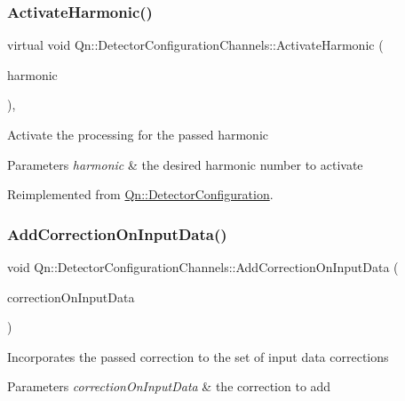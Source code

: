 \subsubsection{\texorpdfstring{Activate\+Harmonic()}{ActivateHarmonic()}}
{\footnotesize\ttfamily virtual void Qn\+::\+Detector\+Configuration\+Channels\+::\+Activate\+Harmonic (\begin{DoxyParamCaption}\item[{Int\+\_\+t}]{harmonic }\end{DoxyParamCaption})\hspace{0.3cm}{\ttfamily [inline]}, {\ttfamily [virtual]}}

Activate the processing for the passed harmonic 
\begin{DoxyParams}{Parameters}
{\em harmonic} & the desired harmonic number to activate \\
\hline
\end{DoxyParams}


Reimplemented from \mbox{\hyperlink{classQn_1_1DetectorConfiguration_a5bb71f7e186c058cad8c6bba4f2596cd}{Qn\+::\+Detector\+Configuration}}.

\mbox{\label{classQn_1_1DetectorConfigurationChannels_ab5c641503809ce981651bb08ffc50f0e}} 
\subsubsection{\texorpdfstring{Add\+Correction\+On\+Input\+Data()}{AddCorrectionOnInputData()}}
{\footnotesize\ttfamily void Qn\+::\+Detector\+Configuration\+Channels\+::\+Add\+Correction\+On\+Input\+Data (\begin{DoxyParamCaption}\item[{\mbox{\hyperlink{classQn_1_1CorrectionOnInputData}{Correction\+On\+Input\+Data}} $\ast$}]{correction\+On\+Input\+Data }\end{DoxyParamCaption})\hspace{0.3cm}{\ttfamily [virtual]}}

Incorporates the passed correction to the set of input data corrections 
\begin{DoxyParams}{Parameters}
{\em correction\+On\+Input\+Data} & the correction to add \\
\hline
\end{DoxyParams}


